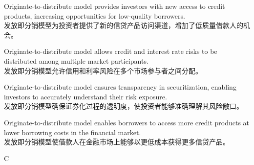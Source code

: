 \documentclass{article}
\begin{document}
    \begin{choices}
        \item Originate-to-distribute model provides investors with new access to credit products, increasing opportunities for low-quality borrowers.\\
        发放即分销模型为投资者提供了新的信贷产品访问渠道，增加了低质量借款人的机会。
        
        \item Originate-to-distribute model allows credit and interest rate risks to be distributed among multiple market participants.\\
        发放即分销模型允许信用和利率风险在多个市场参与者之间分配。
        
        \item Originate-to-distribute model ensures transparency in securitization, enabling investors to accurately understand their risk exposure.\\
        发放即分销模型确保证券化过程的透明度，使投资者能够准确理解其风险敞口。
        
        \item Originate-to-distribute model enables borrowers to access more credit products at lower borrowing costs in the financial market.\\
        发放即分销模型使借款人在金融市场上能够以更低成本获得更多信贷产品。
    \end{choices}
 
    \begin{correctanswer}
        C
    \end{correctanswer}
    
\end{document}
